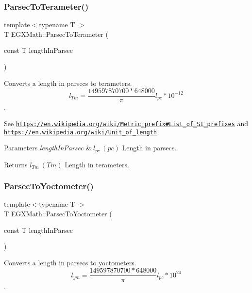 \subsubsection{\texorpdfstring{Parsec\+To\+Terameter()}{ParsecToTerameter()}}
{\footnotesize\ttfamily template$<$typename T $>$ \\
T E\+G\+X\+Math\+::\+Parsec\+To\+Terameter (\begin{DoxyParamCaption}\item[{const T}]{length\+In\+Parsec }\end{DoxyParamCaption})}



Converts a length in parsecs to terameters. \[ l_{Tm}=\frac{149597870700 * 648000}{\pi}l_{pc} * 10^{-12} \]. 

See \href{https://en.wikipedia.org/wiki/Metric_prefix#List_of_SI_prefixes}{\tt https\+://en.\+wikipedia.\+org/wiki/\+Metric\+\_\+prefix\#\+List\+\_\+of\+\_\+\+S\+I\+\_\+prefixes} and \href{https://en.wikipedia.org/wiki/Unit_of_length}{\tt https\+://en.\+wikipedia.\+org/wiki/\+Unit\+\_\+of\+\_\+length} 
\begin{DoxyParams}{Parameters}
{\em length\+In\+Parsec} & $ l_{pc}\ (pc)$ Length in parsecs. \\
\hline
\end{DoxyParams}
\begin{DoxyReturn}{Returns}
$ l_{Tm}\ (Tm)$ Length in terameters. 
\end{DoxyReturn}
\mbox{\label{group___e_g_x_math-_conversions-_length_conversions-_astronomical-_parsec-_s_i_ga2c745c68a73ead9c11af6bc86ce3e3f6}} 
\subsubsection{\texorpdfstring{Parsec\+To\+Yoctometer()}{ParsecToYoctometer()}}
{\footnotesize\ttfamily template$<$typename T $>$ \\
T E\+G\+X\+Math\+::\+Parsec\+To\+Yoctometer (\begin{DoxyParamCaption}\item[{const T}]{length\+In\+Parsec }\end{DoxyParamCaption})}



Converts a length in parsecs to yoctometers. \[ l_{ym}=\frac{149597870700 * 648000}{\pi}l_{pc} * 10^{24} \]. 

